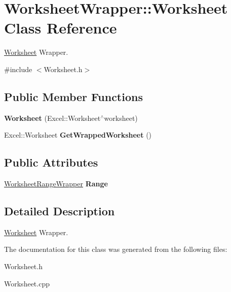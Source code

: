 \hypertarget{class_worksheet_wrapper_1_1_worksheet}{}\section{Worksheet\+Wrapper\+:\+:Worksheet Class Reference}
\label{class_worksheet_wrapper_1_1_worksheet}


\hyperlink{class_worksheet_wrapper_1_1_worksheet}{Worksheet} Wrapper.  




{\ttfamily \#include $<$Worksheet.\+h$>$}

\subsection*{Public Member Functions}
\begin{DoxyCompactItemize}
\item 
\hypertarget{class_worksheet_wrapper_1_1_worksheet_a2e80e974c1425e77f3a26e74324c6fab}{}{\bfseries Worksheet} (Excel\+::\+Worksheet$^\wedge$worksheet)\label{class_worksheet_wrapper_1_1_worksheet_a2e80e974c1425e77f3a26e74324c6fab}

\item 
\hypertarget{class_worksheet_wrapper_1_1_worksheet_a7388e6aa4cd8ba9b29b74c253c2375fa}{}Excel\+::\+Worksheet {\bfseries Get\+Wrapped\+Worksheet} ()\label{class_worksheet_wrapper_1_1_worksheet_a7388e6aa4cd8ba9b29b74c253c2375fa}

\end{DoxyCompactItemize}
\subsection*{Public Attributes}
\begin{DoxyCompactItemize}
\item 
\hypertarget{class_worksheet_wrapper_1_1_worksheet_a5fb5df8c6dd989778d0898c235aec39e}{}\hyperlink{class_worksheet_wrapper_1_1_worksheet_range_wrapper}{Worksheet\+Range\+Wrapper} {\bfseries Range}\label{class_worksheet_wrapper_1_1_worksheet_a5fb5df8c6dd989778d0898c235aec39e}

\end{DoxyCompactItemize}


\subsection{Detailed Description}
\hyperlink{class_worksheet_wrapper_1_1_worksheet}{Worksheet} Wrapper. 

The documentation for this class was generated from the following files\+:\begin{DoxyCompactItemize}
\item 
Worksheet.\+h\item 
Worksheet.\+cpp\end{DoxyCompactItemize}
